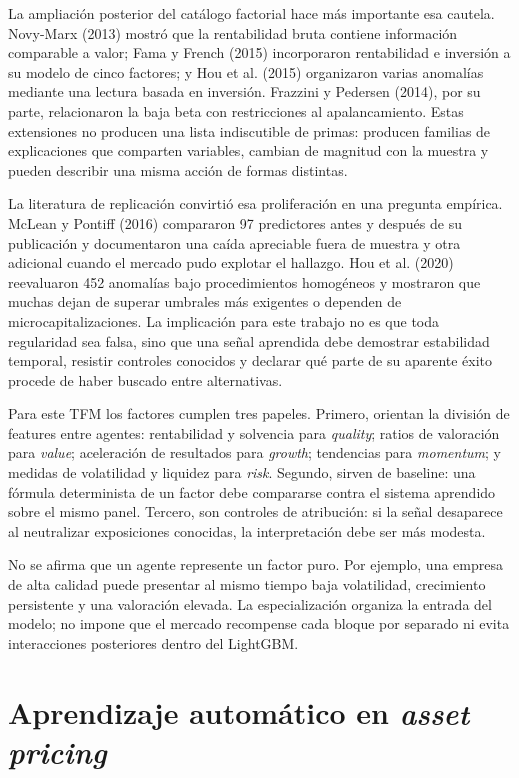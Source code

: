 La ampliación posterior del catálogo factorial hace más importante esa cautela. Novy-Marx (2013)
mostró que la rentabilidad bruta contiene información comparable a valor; Fama y French (2015)
incorporaron rentabilidad e inversión a su modelo de cinco factores; y Hou et al. (2015) organizaron
varias anomalías mediante una lectura basada en inversión. Frazzini y Pedersen (2014), por su parte,
relacionaron la baja beta con restricciones al apalancamiento. Estas extensiones no producen una
lista indiscutible de primas: producen familias de explicaciones que comparten variables, cambian de
magnitud con la muestra y pueden describir una misma acción de formas distintas.

La literatura de replicación convirtió esa proliferación en una pregunta empírica. McLean y Pontiff
(2016) compararon 97 predictores antes y después de su publicación y documentaron una caída apreciable
fuera de muestra y otra adicional cuando el mercado pudo explotar el hallazgo. Hou et al. (2020)
reevaluaron 452 anomalías bajo procedimientos homogéneos y mostraron que muchas dejan de superar
umbrales más exigentes o dependen de microcapitalizaciones. La implicación para este trabajo no es
que toda regularidad sea falsa, sino que una señal aprendida debe demostrar estabilidad temporal,
resistir controles conocidos y declarar qué parte de su aparente éxito procede de haber buscado entre
alternativas.

Para este TFM los factores cumplen tres papeles. Primero, orientan la división de features entre
agentes: rentabilidad y solvencia para \textit{quality}; ratios de valoración para \textit{value};
aceleración de resultados para \textit{growth}; tendencias para \textit{momentum}; y medidas de
volatilidad y liquidez para \textit{risk}. Segundo, sirven de baseline: una fórmula determinista de
un factor debe compararse contra el sistema aprendido sobre el mismo panel. Tercero, son controles
de atribución: si la señal desaparece al neutralizar exposiciones conocidas, la interpretación debe
ser más modesta.

No se afirma que un agente represente un factor puro. Por ejemplo, una empresa de alta calidad puede
presentar al mismo tiempo baja volatilidad, crecimiento persistente y una valoración elevada. La
especialización organiza la entrada del modelo; no impone que el mercado recompense cada bloque por
separado ni evita interacciones posteriores dentro del LightGBM.

\section{Aprendizaje automático en \textit{asset pricing}}

